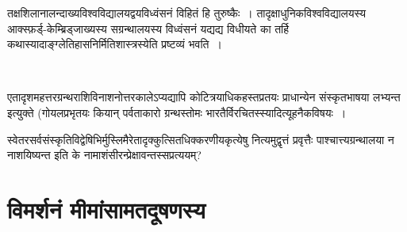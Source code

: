 तक्षशिलानालन्दाख्यविश्वविद्यालयद्वयविध्वंसनं विहितं हि तुरुष्कैः~। तादृक्षाधुनिकविश्वविद्यालयस्य आक्स्फ़र्ड्-केम्ब्रिड्जाख्यस्य सग्रन्थालयस्य विध्वंसनं यद्यद्य विधीयते का तर्हि कथा\break स्यादाङ्ग्लेतिहासनिर्मितिशास्त्रस्येति प्रष्टव्यं भवति~।

\begin{myquote}

~\hfill {} 
\end{myquote}

एतादृशमहत्तरग्रन्थराशिविनाशनोत्तरकालेऽप्यद्यापि कोटित्रयाधिकहस्तप्रतयः प्राधान्येन संस्कृतभाषया लभ्यन्त इत्युक्ते (गोयलप्रभृतयः  कियान् पर्वताकारो ग्रन्थस्तोमः भारतैर्विरचितस्स्यादित्यूहनैकविषयः~।

स्वेतरसर्वसंस्कृतिविद्वेषिभिर्मुस्लिमैरेतादृक्कुत्सितधिक्करणीयकृत्येषु नित्यमुद्वृत्तं प्रवृत्तैः पाश्चात्त्यग्रन्थालया न नाशयिष्यन्त इति के नामाशंसीरन्प्रेक्षावन्तस्सप्रत्ययम्?

\vspace{-.35cm}

\section*{विमर्शनं मीमांसामतदूषणस्य}

